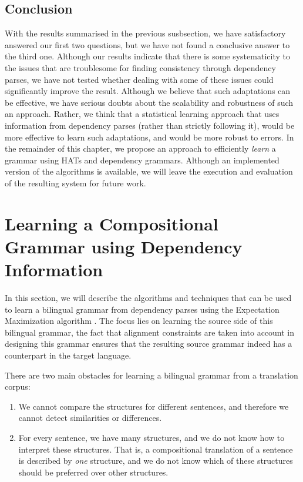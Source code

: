 \subsection{Conclusion}

With the results summarised in the previous susbsection, we have satisfactory answered our first two questions, but we have not found a conclusive answer to the third one. Although our results indicate that there is some systematicity to the issues that are troublesome for finding consistency through dependency parses, we have not tested whether dealing with some of these issues could significantly improve the result. Although we believe that such adaptations can be effective, we have serious doubts about the scalability and robustness of such an approach. Rather, we think that a statistical learning approach that uses information from dependency parses (rather than strictly following it), would be more effective to learn such adaptations, and would be more robust to errors. In the remainder of this chapter, we propose an approach to efficiently \textit{learn} a grammar using HATs and dependency grammars. Although an implemented version of the algorithms is available, we will leave the execution and evaluation of the resulting system for future work.


\section{Learning a Compositional Grammar using Dependency Information}
\label{sec:future}

In this section, we will describe the algorithms and techniques that can be used to learn a bilingual grammar from dependency parses using the Expectation Maximization algorithm \citep{dempster1977maximum}. The focus lies on learning the source side of this bilingual grammar, the fact that alignment constraints are taken into account in designing this grammar ensures that the resulting source grammar indeed has a counterpart in the target language.

There are two main obstacles for learning a bilingual grammar from a translation corpus:\begin{enumerate}
\item We cannot compare the structures for different sentences, and therefore we cannot detect similarities or differences.
\item For every sentence, we have many structures, and we do not know how to interpret these structures. That is, a compositional translation of a sentence is described by \textit{one} structure, and we do not know which of these structures should be preferred over other structures.
\end{enumerate}

